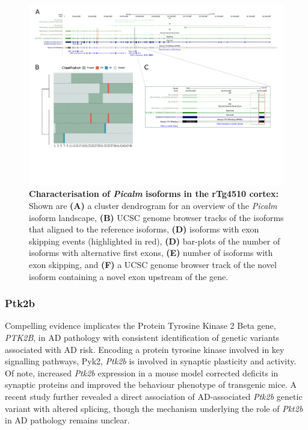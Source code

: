\begin{landscape}
	\begin{figure}[htp]
		\centering
		\captionsetup{width=1.3\textwidth}
		\includegraphics[page=8,trim={0 1cm 0 0},scale = 0.8]{Figures/TargetGenes_Annotation_Landscape.pdf}
		\caption[Characterisation of \textit{Picalm} isoforms in the rTg4510 cortex]%
		{\textbf{Characterisation of \textit{Picalm} isoforms in the rTg4510 cortex:} Shown are \textbf{(A)} a cluster dendrogram for an overview of the \textit{Picalm} isoform landscape, \textbf{(B)} UCSC genome browser tracks of the isoforms that aligned to the reference isoforms, \textbf{(D)} isoforms with exon skipping events (highlighted in red), \textbf{(D)} bar-plots of the number of isoforms with alternative first exons, \textbf{(E)} number of isoforms with exon skipping, and \textbf{(F)} a UCSC genome browser track of the novel isoform containing a novel exon upstream of the gene.}    
		\label{fig:picalm}
	\end{figure}
\end{landscape}
\restoregeometry

\newpage
\subsubsection{Ptk2b}
Compelling evidence implicates the Protein Tyrosine Kinase 2 Beta gene, \textit{PTK2B}, in AD pathology with consistent identification of genetic variants associated with AD risk. Encoding a protein tyrosine kinase involved in key signalling pathways, Pyk2, \textit{Ptk2b} is involved in synaptic plasticity and activity. Of note, increased \textit{Ptk2b} expression in a mouse model corrected deficits in synaptic proteins and improved the behaviour phenotype of transgenic mice\cite{Giralt2018}. A recent study further revealed a direct association of AD-associated \textit{Ptk2b} genetic variant with altered splicing\cite{Raj2018}, though the mechanism underlying the role of \textit{Pkt2b} in AD pathology remains unclear.

